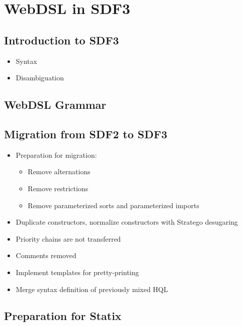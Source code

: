 
\chapter{\label{chap:sdf3}WebDSL in SDF3}

  \section{Introduction to SDF3}

    \begin{itemize}
      \item Syntax
      \item Disambiguation
    \end{itemize}
  
  \section{WebDSL Grammar}

  \section{Migration from SDF2 to SDF3}

    \begin{itemize}
      \item Preparation for migration:
        \begin{itemize}
          \item Remove alternations
          \item Remove restrictions
          \item Remove parameterized sorts and parameterized imports
        \end{itemize}
      \item Duplicate constructors, normalize constructors with Stratego desugaring
      \item Priority chains are not transferred
      \item Comments removed
      \item Implement templates for pretty-printing
      \item Merge syntax definition of previously mixed HQL
    \end{itemize}

  \section{Preparation for Statix}

